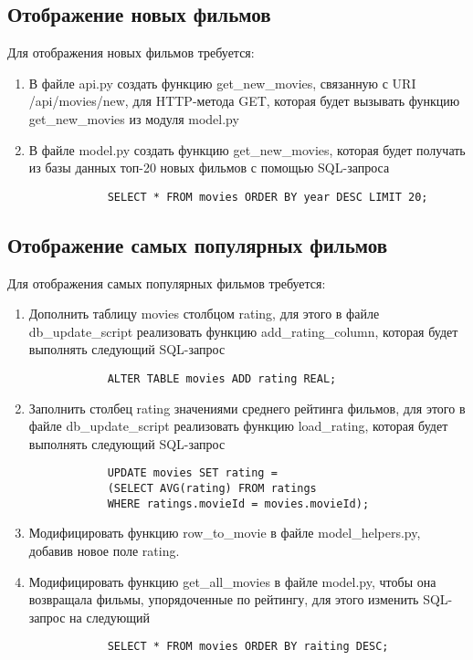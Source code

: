 \documentclass[a4paper,12pt]{report} %
\begin{document}
    \subsection{Отображение новых фильмов}
    Для отображения новых фильмов требуется:
    \begin{enumerate}
    	\item В файле api.py создать функцию get\_new\_movies,  связанную с URI /api/movies/new, для HTTP-метода GET, которая будет вызывать функцию get\_new\_movies из модуля model.py
    	\item В файле model.py создать функцию get\_new\_movies, которая будет получать из базы данных топ-20 новых фильмов с помощью SQL-запроса
    	\begin{verbatim}
    	    SELECT * FROM movies ORDER BY year DESC LIMIT 20;
    	\end{verbatim}
    \end{enumerate}
    \subsection{Отображение самых популярных фильмов}
    Для отображения самых популярных фильмов требуется:
    \begin{enumerate}
    	\item Дополнить таблицу movies столбцом rating, для этого в файле db\_update\_script реализовать функцию add\_rating\_column, которая будет выполнять следующий SQL-запрос 
    	\begin{verbatim}
    		ALTER TABLE movies ADD rating REAL;
    	\end{verbatim}
        \item Заполнить столбец rating значениями среднего рейтинга фильмов, для этого в файле db\_update\_script реализовать функцию load\_rating, которая будет выполнять следующий SQL-запрос
        \begin{verbatim}
        	UPDATE movies SET rating = 
        	(SELECT AVG(rating) FROM ratings
        	WHERE ratings.movieId = movies.movieId);
        \end{verbatim}
        \item Модифицировать функцию row\_to\_movie в файле model\_helpers.py, добавив новое поле rating.
    	\item Модифицировать функцию get\_all\_movies в файле model.py, чтобы она возвращала фильмы, упорядоченные по рейтингу, для этого изменить SQL-запрос на следующий
    	\begin{verbatim}
    		SELECT * FROM movies ORDER BY raiting DESC;
    	\end{verbatim}
    \end{enumerate}
    
\end{document}
